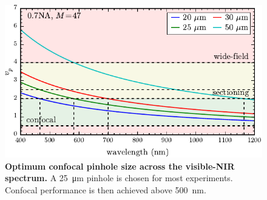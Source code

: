 \documentclass{article}
\begin{document}
\begin{figure}[bt]
\centering
\includegraphics{figures/confocal_pinhole_choice}
\caption[Optimum confocal pinhole size across the visible-NIR spectrum]{\textbf{Optimum confocal pinhole size across the visible-NIR spectrum.} A \SI{25}{\micro\metre} pinhole is chosen for most experiments. Confocal performance is then achieved above \SI{500}{nm}.}
\label{fig:confocal_pinhole_choice}
\end{figure}
\end{document}
